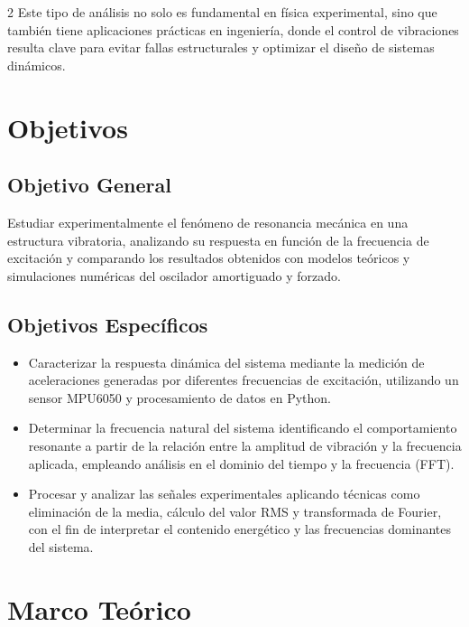 \documentclass[10pt]{article}
\begin{document}
\begin{multicols}{2}
Este tipo de análisis no solo es fundamental en física experimental, sino que también tiene aplicaciones prácticas en ingeniería, donde el control de vibraciones resulta clave para evitar fallas estructurales y optimizar el diseño de sistemas dinámicos.

\section{Objetivos}

\subsection{Objetivo General}

Estudiar experimentalmente el fenómeno de resonancia mecánica en una estructura vibratoria, analizando su respuesta en función de la frecuencia de excitación y comparando los resultados obtenidos con modelos teóricos y simulaciones numéricas del oscilador amortiguado y forzado.

\subsection{Objetivos Específicos}
\begin{itemize}

\item Caracterizar la respuesta dinámica del sistema mediante la medición de aceleraciones generadas por diferentes frecuencias de excitación, utilizando un sensor MPU6050 y procesamiento de datos en Python.

\item Determinar la frecuencia natural del sistema identificando el comportamiento resonante a partir de la relación entre la amplitud de vibración y la frecuencia aplicada, empleando análisis en el dominio del tiempo y la frecuencia (FFT).

\item Procesar y analizar las señales experimentales aplicando técnicas como eliminación de la media, cálculo del valor RMS y transformada de Fourier, con el fin de interpretar el contenido energético y las frecuencias dominantes del sistema.

\end{itemize}
\section{Marco Teórico}


\end{multicols}
\end{document}
